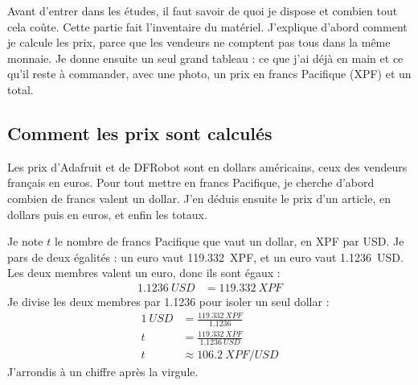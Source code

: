 
Avant d'entrer dans les études, il faut savoir de quoi je dispose et combien tout cela coûte. Cette partie fait l'inventaire du matériel. J'explique d'abord comment je calcule les prix, parce que les vendeurs ne comptent pas tous dans la même monnaie. Je donne ensuite un seul grand tableau : ce que j'ai déjà en main et ce qu'il reste à commander, avec une photo, un prix en francs Pacifique (XPF) et un total.

\subsection{Comment les prix sont calculés}

Les prix d'Adafruit et de DFRobot sont en dollars américains, ceux des vendeurs français en euros. Pour tout mettre en francs Pacifique, je cherche d'abord combien de francs valent un dollar. J'en déduis ensuite le prix d'un article, en dollars puis en euros, et enfin les totaux.

\begin{demonstration}
Je note $t$ le nombre de francs Pacifique que vaut un dollar, en XPF par USD. Je pars de deux égalités : un euro vaut \qty{119,332}{XPF}, et un euro vaut \qty{1,1236}{USD}. Les deux membres valent un euro, donc ils sont égaux :
\begin{align*}
\qty{1,1236}{USD} &= \qty{119,332}{XPF}
\end{align*}
Je divise les deux membres par \num{1,1236} pour isoler un seul dollar :
\begin{align*}
\qty{1}{USD} &= \frac{\qty{119,332}{XPF}}{\num{1,1236}}\\
t &= \frac{\qty{119,332}{XPF}}{\num{1,1236}\ \unit{USD}}\\
t &\approx \qty{106,2}{XPF/USD}
\end{align*}
J'arrondis à un chiffre après la virgule.
\end{demonstration}

